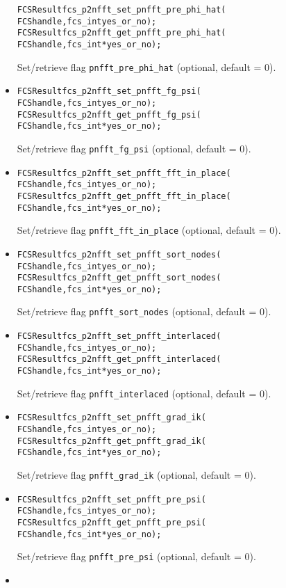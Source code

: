 \begin{itemize}
\begin{alltt}
FCSResult fcs_p2nfft_set_pnfft_pre_phi_hat(
    FCS handle, fcs_int yes_or_no);
FCSResult fcs_p2nfft_get_pnfft_pre_phi_hat(
    FCS handle, fcs_int* yes_or_no);
\end{alltt}
    Set/retrieve flag \verb!pnfft_pre_phi_hat! (optional, default = 0).
  \item
\begin{alltt}
FCSResult fcs_p2nfft_set_pnfft_fg_psi(
    FCS handle, fcs_int yes_or_no);
FCSResult fcs_p2nfft_get_pnfft_fg_psi(
    FCS handle, fcs_int* yes_or_no);
\end{alltt}
    Set/retrieve flag \verb!pnfft_fg_psi! (optional, default = 0).
  \item
\begin{alltt}
FCSResult fcs_p2nfft_set_pnfft_fft_in_place(
    FCS handle, fcs_int yes_or_no);
FCSResult fcs_p2nfft_get_pnfft_fft_in_place(
    FCS handle, fcs_int* yes_or_no);
\end{alltt}
    Set/retrieve flag \verb!pnfft_fft_in_place! (optional, default = 0).
  \item
\begin{alltt}
FCSResult fcs_p2nfft_set_pnfft_sort_nodes(
    FCS handle, fcs_int yes_or_no);
FCSResult fcs_p2nfft_get_pnfft_sort_nodes(
    FCS handle, fcs_int* yes_or_no);
\end{alltt}
    Set/retrieve flag \verb!pnfft_sort_nodes! (optional, default = 0).
  \item
\begin{alltt}
FCSResult fcs_p2nfft_set_pnfft_interlaced(
    FCS handle, fcs_int yes_or_no);
FCSResult fcs_p2nfft_get_pnfft_interlaced(
    FCS handle, fcs_int* yes_or_no);
\end{alltt}
    Set/retrieve flag \verb!pnfft_interlaced! (optional, default = 0).
  \item
\begin{alltt}
FCSResult fcs_p2nfft_set_pnfft_grad_ik(
    FCS handle, fcs_int yes_or_no);
FCSResult fcs_p2nfft_get_pnfft_grad_ik(
    FCS handle, fcs_int* yes_or_no);
\end{alltt}
    Set/retrieve flag \verb!pnfft_grad_ik! (optional, default = 0).
  \item
\begin{alltt}
FCSResult fcs_p2nfft_set_pnfft_pre_psi(
    FCS handle, fcs_int yes_or_no);
FCSResult fcs_p2nfft_get_pnfft_pre_psi(
    FCS handle, fcs_int* yes_or_no);
\end{alltt}
    Set/retrieve flag \verb!pnfft_pre_psi! (optional, default = 0).
  \item

\end{itemize}
